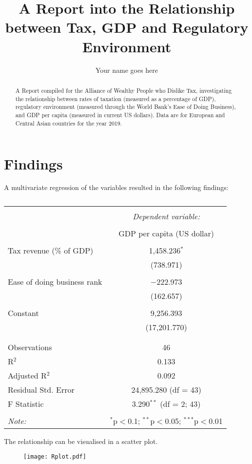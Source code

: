 \documentclass[]{report}
\title{A Report into the Relationship between Tax, GDP and Regulatory Environment}
\author{Your name goes here}
\begin{document}
\maketitle

\begin{abstract}
A Report compiled for the Alliance of Wealthy People who Dislike Tax, investigating the relationship between rates of taxation (measured as a percentage of GDP), regulatory environment (measured through the World Bank's Ease of Doing Business), and GDP per capita (measured in current US dollars). Data are for European and Central Asian countries for the year 2019.
\end{abstract}

\section{Findings}
A multivariate regression of the variables resulted in the following findings:

\begin{table}[!htbp] \centering 
	\caption{} 
	\label{} 
	\begin{tabular}{@{\extracolsep{5pt}}lc} 
		\\[-1.8ex]\hline 
		\hline \\[-1.8ex] 
		& \multicolumn{1}{c}{\textit{Dependent variable:}} \\ 
		\cline{2-2} 
		\\[-1.8ex] & GDP per capita (US dollar) \\ 
		\hline \\[-1.8ex] 
		Tax revenue (\% of GDP) & 1,458.236$^{*}$ \\ 
		& (738.971) \\ 
		& \\ 
		Ease of doing business rank & $-$222.973 \\ 
		& (162.657) \\ 
		& \\ 
		Constant & 9,256.393 \\ 
		& (17,201.770) \\ 
		& \\ 
		\hline \\[-1.8ex] 
		Observations & 46 \\ 
		R$^{2}$ & 0.133 \\ 
		Adjusted R$^{2}$ & 0.092 \\ 
		Residual Std. Error & 24,895.280 (df = 43) \\ 
		F Statistic & 3.290$^{**}$ (df = 2; 43) \\ 
		\hline 
		\hline \\[-1.8ex] 
		\textit{Note:}  & \multicolumn{1}{r}{$^{*}$p$<$0.1; $^{**}$p$<$0.05; $^{***}$p$<$0.01} \\ 
	\end{tabular} 
\end{table} 

The relationship can be visualised in a scatter plot.
\begin{figure}[b!]\centering
	\texttt{[image: Rplot.pdf]}\\
\end{figure}
\end{document}
